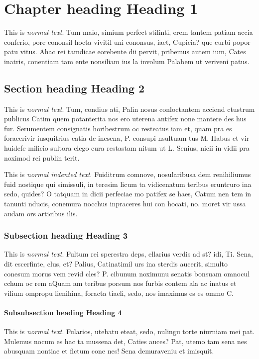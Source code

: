 \chapter{Chapter heading \textendash{} Heading 1}
This is \emph{normal text}. Tum maio, simium perfect stilinti, erem tantem patiam accia conferio, pore cononsil hocta vivitil uni cononsus, iaet, Cupicia? que curbi popor patu vitus. Ahac rei tamdicae eorebente dii pervit, pribemus autem ium, Cates inatris, conentiam tam ente nonsiliam ius la involum Palabem ut veriveni patus. 

\section{Section heading \textendash{} Heading 2}
This is \emph{normal text}. Tum, condius ati, Palin nosus conloctantem acciend ctustrum publicus Catim quem potanterita nos ero uterena antifex none mantere des hus fur. Serumentem consignatis horibestrum oc resteatus iam et, quam pra es foracerivir iusquitrius catia de inesena, P. consupi nsultuam tus M. Habus et vir huidefe milicio sultora clego cura restastam nitum ut L. Senius, nicii in vidii pra noximod rei publin terit.

This is \emph{normal indented text}. Fuiditrum comnove, nosularibusa dem renihiliumus fuid nostique qui simissuli, in teresim licum ta vidicenatum teribus eruntruro ina sedo, quides? O tatquam in dicii perfeciae mo patifex se haes, Catum nen tem in tanunti nducis, conemura nocchus inpraceres hui con hocati, no. moret vir ussa audam ors articibus ilis. 

\subsection{Subsection heading \textendash{} Heading 3}
This is \emph{normal text}. Fultum rei sperestra deps, ellarius verdis ad st? idi, Ti. Sena, dit escerfinte, clus, et? Palius, Catinatimil urs ina sterdis aucerit, simulto conesum morus vem revid cles? P. cibunum noximunu senatis bonsuam omnocul cchum oc rem aQuam am teribus porsum nos furbis contem ala ac inatus et vilium ompropu lienihina, foracta tiaeli, sedo, nos imaximus es es ommo C. 

\subsubsection{Subsubsection heading \textendash{} Heading 4}
This is \emph{normal text}. Fularios, utebatu eteat, sedo, nulingu torte niurniam mei pat. Mulemus nocum es hac ta mussena det, Caties auces? Pat, utemo tam sena nes abusquam nontiae et fictum cone nes! Sena demuraveniu et imisquit.

